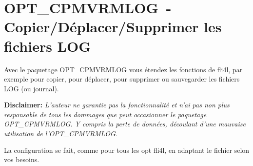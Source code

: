 \section {OPT\_CPMVRMLOG~- Copier/Déplacer/Supprimer les fichiers LOG}

Avec le paquetage OPT\_CPMVRMLOG vous étendez les fonctions de fli4l,
par exemple pour copier, pour déplacer, pour supprimer ou sauvegarder
les fichiers LOG (ou journal).

\textbf{Disclaimer: }\emph{L'auteur ne garantie pas la fonctionnalité et n'ai pas
non plus responsable de tous les dommages que peut occasionner le paquetage
OPT\_\-CPMVRMLOG. Y compris la perte de données, découlant d'une mauvaise
utilisation de l'OPT\_\-CPMVRMLOG.}


La configuration se fait, comme pour tous les opt fli4l, en adaptant le fichier
 selon vos besoins.

